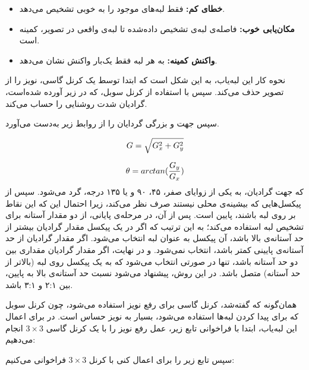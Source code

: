 \documentclass[12pt,a4paper]{article}
\theoremstyle{definition}
\theoremstyle{theorem}
\theoremstyle{definition}
\begin{document}
\begin{itemize}
\renewcommand{\labelitemi}{$\bullet$}
\item \textbf{خطای کم:‌ } 
فقط لبه‌های موجود را به خوبی تشخیص می‌دهد.
\item \textbf{مکان‌یابی خوب: } 
فاصله‌ی لبه‌ی تشخیص‌ داده‌شده تا لبه‌ی واقعی در تصویر، کمینه است.
\item \textbf{واکنش کمینه: } 
به هر لبه فقط یک‌بار واکنش نشان می‌دهد.
\end{itemize}

نحوه کار این لبه‌یاب، به این شکل است که ابتدا توسط یک کرنل گاسی، نویز را از تصویر حذف می‌کند.
سپس با استفاده از کرنل سوبل، که در زیر آورده شده‌است، گرادیان شدت روشنایی را حساب می‌کند.

سپس جهت و بزرگی گردایان را از روابط زیر به‌دست می‌آورد.

\vspace{-0.5cm}
\begin{equation}
\label{gradianMag}
G = \sqrt {G_x^2 + G_y^2}
\vspace{0.2cm}
\end{equation}

\begin{equation}
\label{gradianOr}
\theta = arctan ({G_y \over G_x})
\end{equation}
که جهت گرادیان، به یکی از زوایای صفر، ۴۵، ۹۰ و یا ۱۳۵ درجه، گرد می‌شود.
سپس از پیکسل‌هایی که بیشینه‌ی محلی نیستند صرف نظر می‌کند، زیرا احتمال این که این نقاط بر روی لبه باشند، پایین است. 
پس از آن، در مرحله‌ی پایانی، از دو مقدار آستانه برای تشخیص لبه استفاده می‌کند؛ به این ترتیب که اگر در یک پیکسل مقدار گرادیان بیشتر از حد آستانه‌ی بالا باشد، آن پیکسل به عنوان لبه انتخاب می‌شود. اگر مقدار گرادیان از حد آستانه‌ی پایینی کمتر باشد، انتخاب نمی‌شود. و در نهایت، اگر مقدار گرادیان مقداری بین دو حد آستانه باشد، تنها در صورتی انتخاب می‌شود که به یک پیکسل روی لبه (بالاتر از حد آستانه) متصل باشد. 
در این روش، پیشنهاد می‌شود نسبت حد آستانه‌ی بالا به پایین، بین ۲:۱ و ۳:۱ باشد.

همان‌گونه که گفته‌شد، کرنل گاسی برای رفع نویز استفاده می‌شود، چون کرنل سوبل که برای پیدا کردن لبه‌ها استفاده می‌شود، بسیار به نویز حساس است.
در 
برای اعمال این لبه‌یاب، ابتدا با فراخوانی تابع زیر، عمل رفع نویز را با یک کرنل گاسی 
\( 3 \times 3 \) 
انجام می‌دهیم:

سپس تابع زیر را برای اعمال کنی با کرنل 
\( 3 \times 3 \) 
فراخوانی می‌کنیم: 

\end{document}
